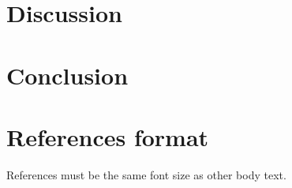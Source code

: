 \documentclass{sigchi}
\begin{document}
\section{Discussion}
\section{Conclusion}

%
%


\section{References format}
References must be the same font size as other body text.


\end{document}
